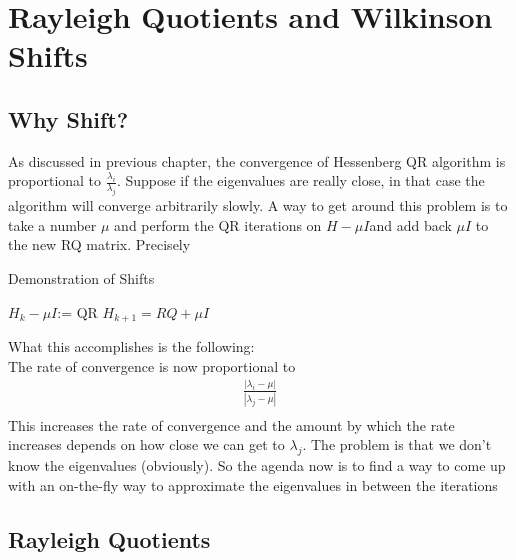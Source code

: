 
\chapter{Rayleigh Quotients and Wilkinson Shifts}

\label{Chapter5} %


\section{Why Shift?}
As discussed in previous chapter, the convergence of Hessenberg QR algorithm is proportional to
$\frac{\lambda_i}{\lambda_j}$. Suppose if the eigenvalues are really close, in that case the algorithm will converge arbitrarily slowly. A way to get around this problem is to take a number
$\mu$ and perform the QR iterations on $H - \mu I $and add back $\mu I$ to the new RQ matrix. Precisely
\begin{algorithm}
    \caption{Demonstration of Shifts}
    \begin{algorithmic}
        \STATE $H_k - \mu I$:= QR
        \STATE $H_{k+1} = RQ + \mu I$
    \end{algorithmic}
\end{algorithm}

What this accomplishes is the following:\\ The rate of convergence is now proportional to 
\begin{align}
    \frac{|\lambda_i - \mu|}{|\lambda_j - \mu|}\\
\end{align}
This increases the rate of convergence and the amount by which the rate increases depends on how close we can get to $\lambda_j$. The problem is that we don't know the eigenvalues (obviously). So the agenda now is to find a way to come up with an on-the-fly way to approximate the eigenvalues in between the iterations

\section{Rayleigh Quotients}
